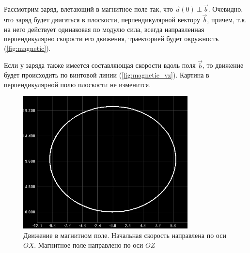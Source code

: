 \documentclass[12pt,a4paper]{article}
\begin{document}
Рассмотрим заряд, влетающий в магнитное поле так, что $\vec{u}(0)\ \bot\ \vec{b}$. Очевидно, что заряд будет двигаться в плоскости, перпендикулярной вектору $\vec{b}$, причем, т.к. на него действует одинаковая по модулю сила, всегда направленная перпендикулярно скорости его движения, траекторией будет окружность (\autoref{fig:magnetic}).

Если у заряда также имеется составляющая скорости вдоль поля $\vec{b}$, то движение будет происходить по винтовой линии (\autoref{fig:magnetic_vz}). Картина в перпендикулярной полю плоскости не изменится.

\begin{figure}[h]%
\centering
\includegraphics[width=0.8\textwidth]{magnetic}%
\caption[Движение в магнитном поле]{Движение в магнитном поле. Начальная скорость направлена по оси $OX$. Магнитное поле направлено по оси $OZ$}%
\label{fig:magnetic}%
\end{figure}
\end{document}
